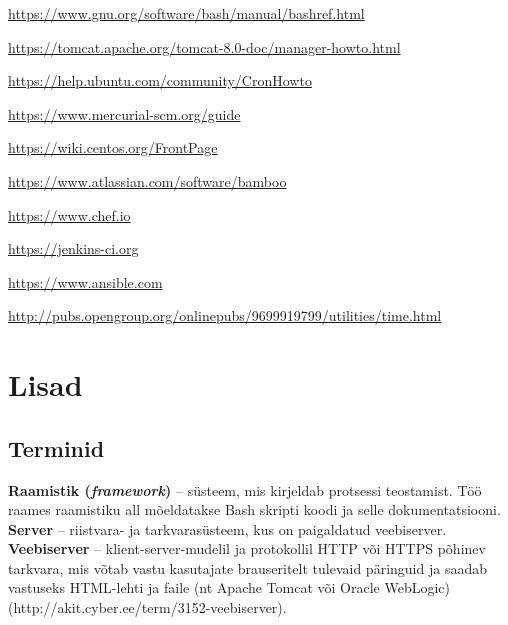 \documentclass[12pt]{report}
\begin{document}
  \begin{thebibliography}{9}
    \label{kasutatud-materjalid}
  
    \url{https://www.gnu.org/software/bash/manual/bashref.html}
    
    \url{https://tomcat.apache.org/tomcat-8.0-doc/manager-howto.html}
  
    \url{https://help.ubuntu.com/community/CronHowto}
  
    \url{https://www.mercurial-scm.org/guide}
  
    \url{https://wiki.centos.org/FrontPage}
  
    \url{https://www.atlassian.com/software/bamboo}
  
    \url{https://www.chef.io}
  
    \url{https://jenkins-ci.org}
  
    \url{https://www.ansible.com}
    
    \url{http://pubs.opengroup.org/onlinepubs/9699919799/utilities/time.html}
 
  \end{thebibliography}

  \newpage
  
  \section*{Lisad}
  \label{lisad}
  
  \subsection*{Terminid}
  
  \textbf{Raamistik (\textit{framework})} \--- süsteem, mis kirjeldab protsessi teostamist. Töö raames raamistiku all mõeldatakse Bash skripti koodi ja selle dokumentatsiooni.\\
  
  \textbf{Server} \--- riistvara- ja tarkvarasüsteem, kus on paigaldatud veebiserver.\\
  
  \textbf{Veebiserver} \--- klient-server-mudelil ja protokollil HTTP või HTTPS põhinev tarkvara, mis võtab vastu kasutajate brauseritelt tulevaid päringuid ja saadab vastuseks HTML-lehti ja faile (nt Apache Tomcat või Oracle WebLogic) (http://akit.cyber.ee/term/3152-veebiserver).\\
  
\end{document}
